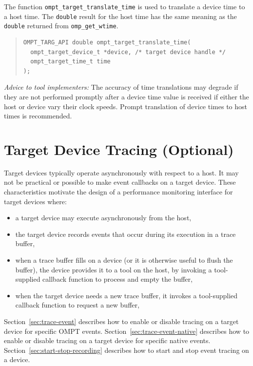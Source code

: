 \documentclass{article}
\begin{document}
The function \verb|ompt_target_translate_time| is used to translate a device time to a host time. The {\tt double} result for the host time has the same meaning as the {\tt double} returned from \verb|omp_get_wtime|.
\begin{quote}
\begin{verbatim}
OMPT_TARG_API double ompt_target_translate_time(
  ompt_target_device_t *device, /* target device handle */
  ompt_target_time_t time
);
\end{verbatim}
\end{quote}
\noindent
{\em Advice to tool implementers:} The accuracy of time translations may degrade if they are not performed promptly after a device time value is received if either the host or device vary their clock speeds. Prompt translation of device times to host times is recommended.

\section{Target Device Tracing (Optional)}
\label{sec:target-device-records}

Target devices typically operate asynchronously with respect to a host. It may not be practical or possible to make event callbacks on a target device. These characteristics motivate the design of a performance monitoring interface for target devices where: 
\begin{itemize}
\item a target device may execute asynchronously from the host,
\item the target device records events that occur during its execution in a trace buffer,
\item when a trace buffer fills on a device (or it is otherwise useful to flush the buffer),  the device provides it to a tool on the host, by invoking a tool-supplied callback function to process and empty the buffer,
\item when the target device needs a new trace buffer, it invokes a tool-supplied callback function to request a new buffer,
\end{itemize}


 Section~\ref{sec:trace-event}  describes how to enable or disable tracing on a target device for specific OMPT events. 
  Section~\ref{sec:trace-event-native}  describes how to enable or disable tracing on a target device for specific native events. Section~\ref{sec:start-stop-recording} describes how to start and stop event tracing on a device. 
  
\end{document}
